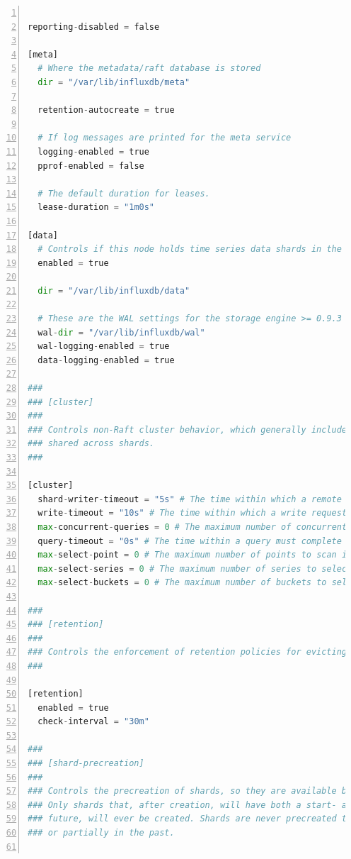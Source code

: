   \begin{lstlisting}[numbers=left, frame=single,tabsize=2,breaklines,caption={Kode sumber Model Auth},label=modelAuth, language=python]

reporting-disabled = false

[meta]
  # Where the metadata/raft database is stored
  dir = "/var/lib/influxdb/meta"

  retention-autocreate = true

  # If log messages are printed for the meta service
  logging-enabled = true
  pprof-enabled = false

  # The default duration for leases.
  lease-duration = "1m0s"

[data]
  # Controls if this node holds time series data shards in the cluster
  enabled = true

  dir = "/var/lib/influxdb/data"

  # These are the WAL settings for the storage engine >= 0.9.3
  wal-dir = "/var/lib/influxdb/wal"
  wal-logging-enabled = true
  data-logging-enabled = true

###
### [cluster]
###
### Controls non-Raft cluster behavior, which generally includes how data is
### shared across shards.
###

[cluster]
  shard-writer-timeout = "5s" # The time within which a remote shard must respond to a write request.
  write-timeout = "10s" # The time within which a write request must complete on the cluster.
  max-concurrent-queries = 0 # The maximum number of concurrent queries that can run. 0 to disable.
  query-timeout = "0s" # The time within a query must complete before being killed automatically. 0s to disable.
  max-select-point = 0 # The maximum number of points to scan in a query. 0 to disable.
  max-select-series = 0 # The maximum number of series to select in a query. 0 to disable.
  max-select-buckets = 0 # The maximum number of buckets to select in an aggregate query. 0 to disable.

###
### [retention]
###
### Controls the enforcement of retention policies for evicting old data.
###

[retention]
  enabled = true
  check-interval = "30m"

###
### [shard-precreation]
###
### Controls the precreation of shards, so they are available before data arrives.
### Only shards that, after creation, will have both a start- and end-time in the
### future, will ever be created. Shards are never precreated that would be wholly
### or partially in the past.


\end{lstlisting}
